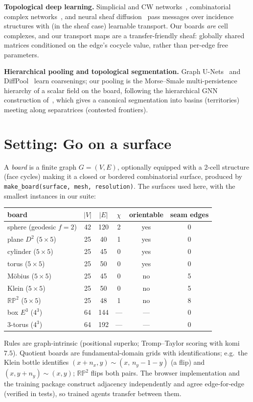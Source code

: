 \documentclass[11pt]{article}
\newcommand{\RP}{\mathbb{RP}}
\begin{document}
\textbf{Topological deep learning.} Simplicial and CW
networks~\cite{bodnar2021cwn}, combinatorial complex
networks~\cite{hajij2022ccnn}, and neural sheaf
diffusion~\cite{bodnar2022sheaf} pass messages over incidence structures
with (in the sheaf case) learnable transport. Our boards \emph{are} cell
complexes, and our transport maps are a transfer-friendly sheaf: globally
shared matrices conditioned on the edge's cocycle value, rather than
per-edge free parameters.

\textbf{Hierarchical pooling and topological segmentation.} Graph
U-Nets~\cite{gao2019unet} and DiffPool~\cite{ying2018diffpool} learn
coarsenings; our pooling is the Morse--Smale multi-persistence hierarchy
of a scalar field on the board, following the hierarchical GNN
construction of~\cite{leventhal2022}, which gives a canonical
segmentation into basins (territories) meeting along separatrices
(contested frontiers).

\section{Setting: Go on a surface}
\label{sec:setting}
A \emph{board} is a finite graph $G=(V,E)$, optionally equipped with a
2-cell structure (face cycles) making it a closed or bordered combinatorial
surface, produced by \texttt{make\_board(surface, mesh, resolution)}. The
surfaces used here, with the smallest instances in our suite:
\begin{center}
\small
\begin{tabular}{lccccc}
\toprule
board & $|V|$ & $|E|$ & $\chi$ & orientable & seam edges \\
\midrule
sphere (geodesic $f{=}2$) & 42 & 120 & 2 & yes & 0 \\
plane $D^2$ ($5\times5$) & 25 & 40 & 1 & yes & 0 \\
cylinder ($5\times5$) & 25 & 45 & 0 & yes & 0 \\
torus ($5\times5$) & 25 & 50 & 0 & yes & 0 \\
M\"obius ($5\times5$) & 25 & 45 & 0 & no & 5 \\
Klein ($5\times5$) & 25 & 50 & 0 & no & 5 \\
$\RP^2$ ($5\times5$) & 25 & 48 & 1 & no & 8 \\
box $E^3$ ($4^3$) & 64 & 144 & --- & --- & 0 \\
3-torus ($4^3$) & 64 & 192 & --- & --- & 0 \\
\bottomrule
\end{tabular}
\end{center}
Rules are graph-intrinsic (positional superko; Tromp--Taylor scoring with
komi $7.5$). Quotient boards are fundamental-domain grids with
identifications; e.g.\ the Klein bottle identifies $(x{+}n_x, y)\sim(x,\,
n_y{-}1{-}y)$ (a flip) and $(x, y{+}n_y)\sim(x,y)$; $\RP^2$ flips both
pairs. The browser implementation and the training package construct
adjacency independently and agree edge-for-edge (verified in tests),
so trained agents transfer between them.
\end{document}
